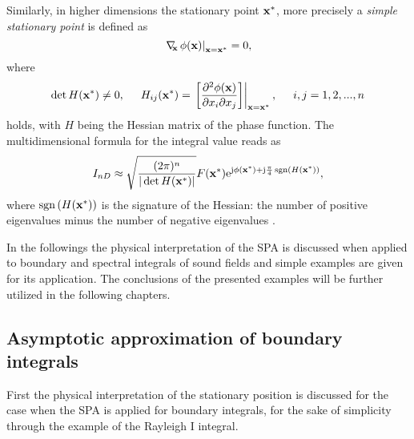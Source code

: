 Similarly, in higher dimensions the stationary point $\mathbf{x}^*$, more precisely a \emph{simple stationary point} is defined as
\begin{equation}
\label{Eq:ndim_stat_point}
\left.
\nabla_{\!\!\mathbf{x}}\, \phi(\mathbf{x})\right|_{\mathbf{x} = \mathbf{x}^*} = 0,
\end{equation}
where 
\begin{equation}
\det H(\mathbf{x}^*) \neq 0,
\hspace{5mm} 
H_{ij}(\mathbf{x}^*) = \left. \left[
\frac{\partial^2 \phi(\mathbf{x})}{\partial x_i \partial x_j} 
\right] \right|_{\mathbf{x} = \mathbf{x}^*},
\hspace{5mm}
i,j = 1,2,...,n
\end{equation}
holds, with $H$ being the Hessian matrix of the phase function.
The multidimensional formula for the integral value reads as
\begin{equation}
\label{Eq:SPAResult_nd}
I_{nD} \approx \sqrt{\frac{(2\pi)^n}{|\det H(\mathbf{x}^*)|}} F(\mathbf{x}^*) \mathrm{e}^{\mathrm{j} \phi(\mathbf{x}^*) + \mathrm{j} \frac{\pi}{4}\,\mathrm{sgn}\left( H(\mathbf{x}^*) \right)},
\end{equation}
where $\mathrm{sgn}\left( H(\mathbf{x}^*) \right)$ is the signature of the Hessian: the number of positive eigenvalues minus the number of negative eigenvalues \cite{Bleistein2000}.

In the followings the physical interpretation of the SPA is discussed when applied to boundary and spectral integrals of sound fields and simple examples are given for its application.
The conclusions of the presented examples will be further utilized in the following chapters.

\subsection{Asymptotic approximation of boundary integrals}
\label{Sec:HS_approx:SPA_for_Rayleigh}
First the physical interpretation of the stationary position is discussed for the case when the SPA is applied for boundary integrals, for the sake of simplicity through the example of the Rayleigh I integral.
%

